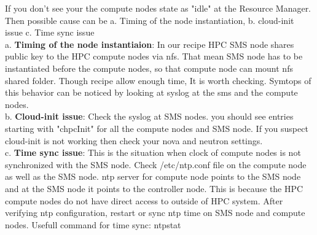 If you don't see your the compute nodes state as "idle" at the Resource Manager. Then possible cause can be a. Timing of the node instantiation, b. cloud-init issue c. Time sync issue \\
a. \textbf{Timing of the node instantiaion}: In our recipe HPC SMS node shares public key to the HPC compute nodes via nfs. That mean SMS node has to be instantiated before the compute nodes, so that compute node can mount nfs shared folder. Though recipe allow enough time, It is worth checking. Symtops of this behavior can be noticed by looking at syslog at the sms and the compute nodes.    \\
b. \textbf{Cloud-init issue}: Check the syslog at SMS nodes. you should see entries starting with "chpcInit" for all the compute nodes and SMS node. If you suspect cloud-init is not working then check your nova and neutron settings.\\
c. \textbf{Time sync issue}: This is the situation when clock of compute nodes is not synchronized with the SMS node. Check /etc/ntp.conf file on the compute node as well as the SMS node. ntp server for compute node points to the SMS node and at the SMS node it points to the controller node. This is because the HPC compute nodes do not have direct access to outside of HPC system. After verifying ntp configuration, restart or sync ntp time on SMS node and compute nodes. Usefull command for time sync: ntpstat\\

	
